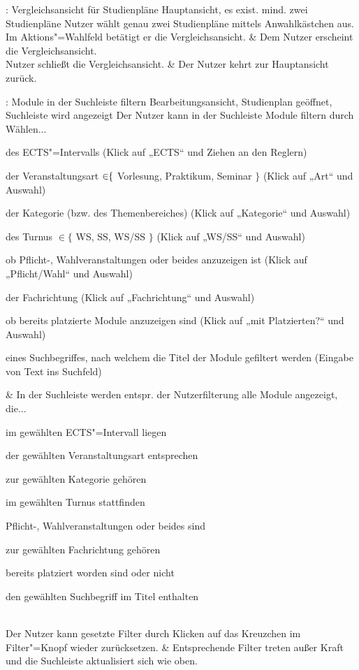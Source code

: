 \begin{usecase}{: Vergleichsansicht für Studienpläne}
	{Hauptansicht, es exist. mind. zwei Studienpläne}
	Nutzer wählt genau zwei Studienpläne mittels Anwahlkästchen aus. Im Aktions"=Wahlfeld betätigt er die Vergleichsansicht.
	& Dem Nutzer erscheint die Vergleichsansicht. \\
	\hline
	Nutzer schließt die Vergleichsansicht. 
	& Der Nutzer kehrt zur Hauptansicht zurück.
\end{usecase}

\begin{usecase}{: Module in der Suchleiste filtern}
	{Bearbeitungsansicht, Studienplan geöffnet, Suchleiste wird angezeigt}
	Der Nutzer kann in der Suchleiste Module filtern durch Wählen...
	\begin{tblitemize}
		\item des ECTS"=Intervalls (Klick auf „ECTS“ und Ziehen an den Reglern)
		\item der Veranstaltungsart $\in\hspace{-3pt}\{$ Vorlesung, Praktikum, Seminar $\}$ (Klick auf „Art“ und Auswahl)
		\item der Kategorie (bzw. des Themenbereiches) (Klick auf „Kategorie“ und Auswahl)
		\item des Turnus $\in \{$ WS, SS, WS/SS $\}$ (Klick auf „WS/SS“ und Auswahl)
		\item ob Pflicht-, Wahlveranstaltungen oder beides anzuzeigen ist (Klick auf „Pflicht/Wahl“ und Auswahl)
		\item der Fachrichtung (Klick auf „Fachrichtung“ und Auswahl)
		\item ob bereits platzierte Module anzuzeigen sind (Klick auf „mit Platzierten?“ und Auswahl)
		\item eines Suchbegriffes, nach welchem die Titel der Module gefiltert werden (Eingabe von Text ins Suchfeld)
	\end{tblitemize}
	& In der Suchleiste werden entspr. der Nutzerfilterung alle Module angezeigt, die...
	\begin{tblitemize}
		\item im gewählten ECTS"=Intervall liegen
		\item der gewählten Veranstaltungsart entsprechen
		\item zur gewählten Kategorie gehören
		\item im gewählten Turnus stattfinden
		\item Pflicht-, Wahlveranstaltungen oder beides sind
		\item zur gewählten Fachrichtung gehören
		\item bereits platziert worden sind oder nicht
		\item den gewählten Suchbegriff im Titel enthalten
	\end{tblitemize} \\
	\hline
	Der Nutzer kann gesetzte Filter durch Klicken auf das Kreuzchen im Filter"=Knopf wieder zurücksetzen.
	& Entsprechende Filter treten außer Kraft und die Suchleiste aktualisiert sich wie oben.
\end{usecase}

